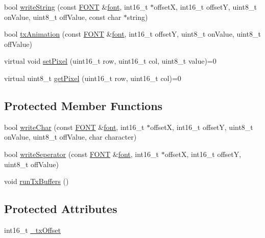\begin{DoxyCompactItemize}
bool \hyperlink{classmhvlib_1_1_display___monochrome_a760f716fbdf5eb293940cebb6dc599cd}{write\-String} (const \hyperlink{namespacemhvlib_ac8cf789cdad5097b81a2d75dc08e6bfc}{F\-O\-N\-T} \&\hyperlink{structmhvlib_1_1font}{font}, int16\-\_\-t $\ast$offset\-X, int16\-\_\-t offset\-Y, uint8\-\_\-t on\-Value, uint8\-\_\-t off\-Value, const char $\ast$string)
\item 
bool \hyperlink{classmhvlib_1_1_display___monochrome_ac7631aada647dd676f8330de4fc87f6f}{tx\-Animation} (const \hyperlink{namespacemhvlib_ac8cf789cdad5097b81a2d75dc08e6bfc}{F\-O\-N\-T} \&\hyperlink{structmhvlib_1_1font}{font}, int16\-\_\-t offset\-Y, uint8\-\_\-t on\-Value, uint8\-\_\-t off\-Value)
\item 
virtual void \hyperlink{classmhvlib_1_1_display___monochrome_a06f427bbf51029a1925334a55c70abf8}{set\-Pixel} (uint16\-\_\-t row, uint16\-\_\-t col, uint8\-\_\-t value)=0
\item 
virtual uint8\-\_\-t \hyperlink{classmhvlib_1_1_display___monochrome_a362dc1e29a27befa8a1acf52f4ba8c13}{get\-Pixel} (uint16\-\_\-t row, uint16\-\_\-t col)=0
\end{DoxyCompactItemize}
\subsection*{Protected Member Functions}
\begin{DoxyCompactItemize}
\item 
bool \hyperlink{classmhvlib_1_1_display___monochrome_afe1a2d68d4722264036573858b7ddcac}{write\-Char} (const \hyperlink{namespacemhvlib_ac8cf789cdad5097b81a2d75dc08e6bfc}{F\-O\-N\-T} \&\hyperlink{structmhvlib_1_1font}{font}, int16\-\_\-t $\ast$offset\-X, int16\-\_\-t offset\-Y, uint8\-\_\-t on\-Value, uint8\-\_\-t off\-Value, char character)
\item 
bool \hyperlink{classmhvlib_1_1_display___monochrome_a1034489ed045eb0a88878dd8ed8b7371}{write\-Seperator} (const \hyperlink{namespacemhvlib_ac8cf789cdad5097b81a2d75dc08e6bfc}{F\-O\-N\-T} \&\hyperlink{structmhvlib_1_1font}{font}, int16\-\_\-t $\ast$offset\-X, int16\-\_\-t offset\-Y, uint8\-\_\-t off\-Value)
\item 
void \hyperlink{classmhvlib_1_1_display___monochrome_a35b8e19916a2f3e8956d6b7f9576d988}{run\-Tx\-Buffers} ()
\end{DoxyCompactItemize}
\subsection*{Protected Attributes}
\begin{DoxyCompactItemize}
\item 
int16\-\_\-t \hyperlink{classmhvlib_1_1_display___monochrome_ae65ec5b39bb3d4f85c9eff257b06704e}{\-\_\-tx\-Offset}
\end{DoxyCompactItemize}



